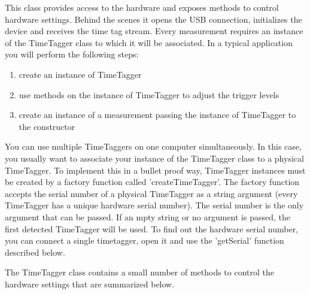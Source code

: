 \documentclass[oneside]{memoir}
\begin{document}
This class provides access to the hardware and exposes methods to control hardware settings.
Behind the scenes it opens the USB connection, initializes the device
and receives the time tag stream. Every measurement requires an
instance of the TimeTagger class to which it will be associated. In a typical application
you will perform the following steps:
\begin{enumerate}
 \item create an instance of TimeTagger
 \item use methods on the instance of TimeTagger to adjust the trigger levels
 \item create an instance of a measurement passing the instance of TimeTagger to the constructor
\end{enumerate}
You can use multiple TimeTaggers on one computer simultaneously. In this case, you usually want to
associate your instance of the TimeTagger class to a physical TimeTagger. To
implement this in a bullet proof way, TimeTagger instances must be created
by a factory function called 'createTimeTagger'. The factory function accepts
the serial number of a physical TimeTagger as a string argument (every
TimeTagger has a unique hardware serial number). The serial number is the only argument that can
be passed. If an mpty string or no argument is passed, the first detected
TimeTagger will be used. To find out the hardware serial number, you can connect
a single timetagger, open it and use the 'getSerial' function described below.

The TimeTagger class contains a small number of methods to control the hardware settings that are summarized below.
\end{document}
